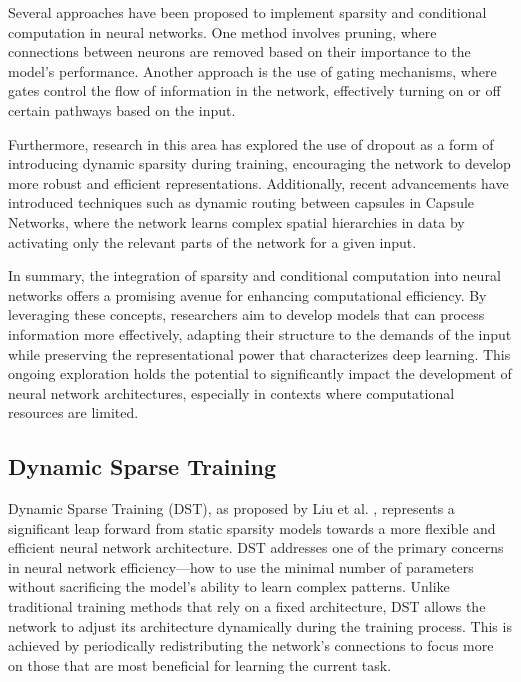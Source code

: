 Several approaches have been proposed to implement sparsity and conditional computation in neural networks. One method involves pruning, where connections between neurons are removed based on their importance to the model's performance. Another approach is the use of gating mechanisms, where gates control the flow of information in the network, effectively turning on or off certain pathways based on the input.

Furthermore, research in this area has explored the use of dropout as a form of introducing dynamic sparsity during training, encouraging the network to develop more robust and efficient representations. Additionally, recent advancements have introduced techniques such as dynamic routing between capsules in Capsule Networks, where the network learns complex spatial hierarchies in data by activating only the relevant parts of the network for a given input.

In summary, the integration of sparsity and conditional computation into neural networks offers a promising avenue for enhancing computational efficiency. By leveraging these concepts, researchers aim to develop models that can process information more effectively, adapting their structure to the demands of the input while preserving the representational power that characterizes deep learning. This ongoing exploration holds the potential to significantly impact the development of neural network architectures, especially in contexts where computational resources are limited.

\subsection{Dynamic Sparse Training}

Dynamic Sparse Training (DST), as proposed by Liu et al. \cite{liu2020dynamic}, represents a significant leap forward from static sparsity models towards a more flexible and efficient neural network architecture. DST addresses one of the primary concerns in neural network efficiency—how to use the minimal number of parameters without sacrificing the model's ability to learn complex patterns. Unlike traditional training methods that rely on a fixed architecture, DST allows the network to adjust its architecture dynamically during the training process. This is achieved by periodically redistributing the network's connections to focus more on those that are most beneficial for learning the current task. 

